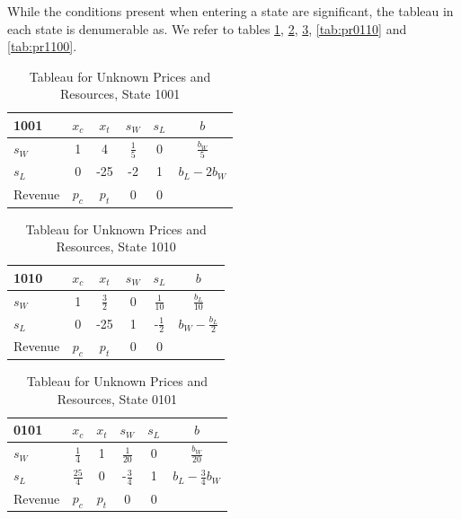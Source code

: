 While the conditions present when entering a state are significant, the tableau in each state is denumerable as. We refer to tables \ref{tab:pr1001}, \ref{tab:pr1010}, \ref{tab:pr0101}, \ref{tab:pr0110} and \ref{tab:pr1100}. 

\begin{table}
\centering
\begin{tabular}{| l | c c c c | c |}
\hline
1001    & $x_c$ & $x_t$ & $s_W$ & $s_L$ & $b$\\
\hline
$s_W$   & 1     & 4      & $\frac{1}{5}$   & 0     & $\frac{b_W}{5}$\\
$s_L$   & 0     & -25    & -2              & 1     & $b_L - 2b_W$\\
\hline
Revenue & $p_c$    & $p_t$    & 0     & 0     &\\
\hline
\end{tabular}
  \caption[Tableau for Unknown Prices and Resources, State 1001]
          {Tableau for Unknown Prices and Resources, State 1001}
  \label{tab:pr1001}
\end{table}

\begin{table}
\centering
\begin{tabular}{| l | c c c c | c |}
\hline
1010    & $x_c$ & $x_t$ & $s_W$ & $s_L$ & $b$\\
\hline
$s_W$   & 1     & $\frac{3}{2}$  & 0   & $\frac{1}{10}$  & $\frac{b_L}{10}$\\
$s_L$   & 0     & -25            & 1   & -$\frac{1}{2}$  & $b_W - \frac{b_L}{2}$\\
\hline
Revenue & $p_c$    & $p_t$    & 0     & 0     &\\
\hline
\end{tabular}
  \caption[Tableau for Unknown Prices and Resources, State 1010]
          {Tableau for Unknown Prices and Resources, State 1010}
  \label{tab:pr1010}
\end{table}

\begin{table}
\centering
\begin{tabular}{| l | c c c c | c |}
\hline
0101    & $x_c$ & $x_t$ & $s_W$ & $s_L$ & $b$\\
\hline
$s_W$   & $\frac{1}{4}$   & 1  & $\frac{1}{20}$   & 0  & $\frac{b_W}{20}$\\
$s_L$   & $\frac{25}{4}$  & 0  & -$\frac{3}{4}$   & 1  & $b_L - \frac{3}{4}b_W$\\
\hline
Revenue & $p_c$    & $p_t$    & 0     & 0     &\\
\hline
\end{tabular}
  \caption[Tableau for Unknown Prices and Resources, State 0101]
          {Tableau for Unknown Prices and Resources, State 0101}
  \label{tab:pr0101}
\end{table}

